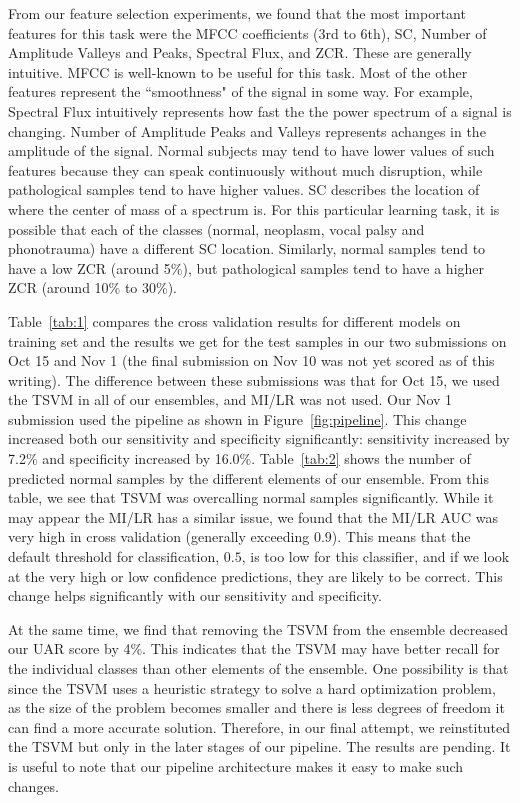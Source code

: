 From our feature selection experiments, we found that the most important features for this task were the MFCC coefficients (3rd to 6th), SC, Number of Amplitude Valleys and Peaks, Spectral Flux, and ZCR. These are generally intuitive. MFCC is well-known to be useful for this task. Most of the other features represent the ``smoothness" of the signal in some way. For example, Spectral Flux intuitively represents how fast the the power spectrum of a signal is changing. Number of Amplitude Peaks and Valleys represents achanges in the amplitude of the signal. Normal subjects may tend to have lower values of such features because they can speak continuously without much disruption, while pathological samples tend to have higher values. SC describes the location of where the center of mass of a spectrum is. For this particular learning task, it is possible that each of the classes (normal, neoplasm, vocal palsy and phonotrauma) have a different SC location. Similarly,  normal samples tend to have a low ZCR (around 5\%), but pathological samples tend to have a higher ZCR (around 10\% to 30\%).

Table~\ref{tab:1} compares the cross validation results for different models on training set and the results we get for the test samples in our two submissions on Oct 15 and Nov 1 (the final submission on Nov 10 was not yet scored as of this writing). The difference between these submissions was that for Oct 15, we used the TSVM in all of our ensembles, and MI/LR was not used. Our Nov 1 submission used the pipeline as shown in Figure~\ref{fig:pipeline}. This change increased both our sensitivity and specificity significantly: sensitivity increased by 7.2\% and specificity increased by 16.0\%.  Table~\ref{tab:2} shows the number of predicted normal samples by the different elements of our ensemble. From this table, we see that TSVM was overcalling normal samples significantly. While it may appear the MI/LR has a similar issue, we found that the MI/LR AUC was very high in cross validation (generally exceeding $0.9$). This means that the default threshold for classification, $0.5$, is too low for this classifier, and if we look at the very high or low confidence predictions, they are likely to be correct. This change helps significantly with our sensitivity and specificity.

At the same time, we find that removing the TSVM from the ensemble decreased our UAR score by 4\%. This indicates that the TSVM may have better recall for the individual classes than other elements of the ensemble. One possibility is that since the TSVM uses a heuristic strategy to solve a hard optimization problem, as the size of the problem becomes smaller and there is less degrees of freedom it can find a more accurate solution. Therefore, in our final attempt, we reinstituted the TSVM but only in the later stages of our pipeline. The results are pending. It is useful to note that our pipeline architecture makes it easy to make such changes.

